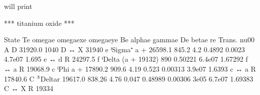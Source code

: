 \documentclass[letterpaper,10pt,english]{sphinxmanual}
\begin{document}
\begin{sphinxVerbatim}[commandchars=\\\{\}]
 
\end{sphinxVerbatim}

will print

\begin{sphinxVerbatim}[commandchars=\\\{\}]
*** titanium oxide ***

State       T\PYGZus{}e            omega\PYGZus{}e    omega\PYGZus{}ex\PYGZus{}e    omega\PYGZus{}ey\PYGZus{}e      B\PYGZus{}e    alpha\PYGZus{}e    gamma\PYGZus{}e       D\PYGZus{}e    beta\PYGZus{}e      r\PYGZus{}e  Trans.       nu\PYGZus{}00  A
\PYGZhy{}\PYGZhy{}\PYGZhy{}\PYGZhy{}\PYGZhy{}\PYGZhy{}\PYGZhy{}\PYGZhy{}\PYGZhy{}\PYGZhy{}  \PYGZhy{}\PYGZhy{}\PYGZhy{}\PYGZhy{}\PYGZhy{}\PYGZhy{}\PYGZhy{}\PYGZhy{}\PYGZhy{}\PYGZhy{}\PYGZhy{}  \PYGZhy{}\PYGZhy{}\PYGZhy{}\PYGZhy{}\PYGZhy{}\PYGZhy{}\PYGZhy{}\PYGZhy{}\PYGZhy{}  \PYGZhy{}\PYGZhy{}\PYGZhy{}\PYGZhy{}\PYGZhy{}\PYGZhy{}\PYGZhy{}\PYGZhy{}\PYGZhy{}\PYGZhy{}\PYGZhy{}\PYGZhy{}  \PYGZhy{}\PYGZhy{}\PYGZhy{}\PYGZhy{}\PYGZhy{}\PYGZhy{}\PYGZhy{}\PYGZhy{}\PYGZhy{}\PYGZhy{}\PYGZhy{}\PYGZhy{}  \PYGZhy{}\PYGZhy{}\PYGZhy{}\PYGZhy{}\PYGZhy{}\PYGZhy{}\PYGZhy{}  \PYGZhy{}\PYGZhy{}\PYGZhy{}\PYGZhy{}\PYGZhy{}\PYGZhy{}\PYGZhy{}\PYGZhy{}\PYGZhy{}  \PYGZhy{}\PYGZhy{}\PYGZhy{}\PYGZhy{}\PYGZhy{}\PYGZhy{}\PYGZhy{}\PYGZhy{}\PYGZhy{}  \PYGZhy{}\PYGZhy{}\PYGZhy{}\PYGZhy{}\PYGZhy{}\PYGZhy{}\PYGZhy{}\PYGZhy{}  \PYGZhy{}\PYGZhy{}\PYGZhy{}\PYGZhy{}\PYGZhy{}\PYGZhy{}\PYGZhy{}\PYGZhy{}  \PYGZhy{}\PYGZhy{}\PYGZhy{}\PYGZhy{}\PYGZhy{}\PYGZhy{}\PYGZhy{}  \PYGZhy{}\PYGZhy{}\PYGZhy{}\PYGZhy{}\PYGZhy{}\PYGZhy{}\PYGZhy{}\PYGZhy{}  \PYGZhy{}\PYGZhy{}\PYGZhy{}\PYGZhy{}\PYGZhy{}\PYGZhy{}\PYGZhy{}\PYGZhy{}  \PYGZhy{}\PYGZhy{}\PYGZhy{}
D           31920.0        1040                                                                                             D ↔ X     31940
e ⁱSigma⁺   a + 26598.1     845.2          4.2                  0.4892     0.0023              4.7e\PYGZhy{}07             1.695    e ↔ d R   24297.5
f ⁱDelta    (a + 19132)     890                                 0.50221                        6.4e\PYGZhy{}07             1.67292  f ↔ a R   19068.9
c ⁱPhi      a + 17890.2     909.6          4.19                 0.523      0.00313             3.9e\PYGZhy{}07             1.6393   c ↔ a R   17840.6
C \(\sp{\text{3}}\)Delta\PYGZus{}r  19617.0         838.26         4.76         0.047   0.48989    0.00306   \PYGZhy{}3e\PYGZhy{}05    6.7e\PYGZhy{}07             1.69383  C ↔ X R   19334

\end{sphinxVerbatim}
\end{document}
